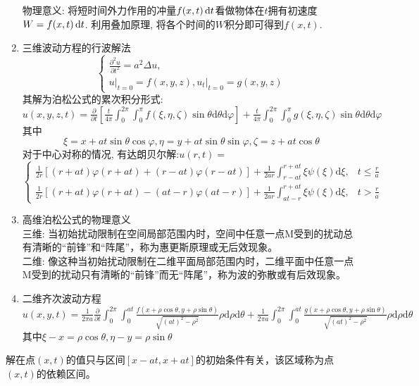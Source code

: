 \documentclass[UTF8,9pt]{ctexart}
\begin{document}
\begin{enumerate}
物理意义: 将短时间外力作用的冲量$f(x,t)\mathop{}\!\mathrm{d} t$看做物体在$t$拥有初速度$W = f(x,t)\mathop{}\!\mathrm{d} t$. 利用叠加原理, 将各个时间的$W$积分即可得到$f(x,t)$.
\item 三维波动方程的行波解法
$$\left\{\begin{array}{ll}{\frac{\partial^{2} u}{\partial t^{2}}=a^{2} \Delta u,}  \\ {\left.u\right|_{t=0}=f(x, y, z),\left.u_{t}\right|_{t=0}=g(x, y, z)}\end{array}\right.$$
其解为泊松公式的累次积分形式:\\
$ u(x,y,z,t)
=\frac{\partial}{\partial t}\left[\frac{t}{4 \pi} \int_{0}^{2 \pi} \int_{0}^{\pi} f(\xi, \eta, \zeta) \sin \theta \mathrm{d} \theta \mathrm{d} \varphi\right]+\frac{t}{4 \pi} \int_{0}^{2 \pi} \int_{0}^{\pi} g(\xi, \eta, \zeta) \sin \theta \mathrm{d} \theta \mathrm{d} \varphi
$
其中$$ 
\xi=x+a t \sin \theta \cos \varphi, \eta=y+a t \sin \theta \sin \varphi, \zeta=z+a t \cos \theta
$$
对于中心对称的情况, 有达朗贝尔解:$u(r, t)=$
$$ 
\left\{\begin{array}{ll}{\frac{1}{2 r}[(r+a t) \varphi(r+a t)+(r-a t) \varphi(r-a t)]+\frac{1}{2 a r} \int_{r-a t}^{r+a t} \xi \psi(\xi) \mathrm{d} \xi,} & {t \leq \frac{r}{a}} \\ {\frac{1}{2 r}[(r+a t) \varphi(r+a t)-(a t-r) \varphi(a t-r)]+\frac{1}{2 a r} \int_{a t-r}^{r+a t} \xi \psi(\xi) \mathrm{d} \xi,} & {t>\frac{r}{a}}\end{array}\right.
$$
\item 高维泊松公式的物理意义\\
三维: 当初始扰动限制在空间局部范围内时，空间中任意一点M受到的扰动总有清晰的“前锋”和“阵尾”，称为惠更斯原理或无后效现象。\\
二维: 像这种当初始扰动限制在二维平面局部范围内时，二维平面中任意一点M受到的扰动只有清晰的“前锋”而无“阵尾”，称为波的弥散或有后效现象。
\item 二维齐次波动方程\\
$
u(x, y, t)=\frac{1}{2 \pi a} \frac{\partial}{\partial t} \int_{0}^{2 \pi} \int_{0}^{at} \frac{f(x+\rho \cos \theta, y+\rho \sin \theta)}{\sqrt{(at)^{2}-\rho^{2}}} \rho \mathrm{d} \rho \mathrm{d} \theta+\frac{1}{2 \pi a} \int_{0}^{2 \pi} \int_{0}^{a t} \frac{g(x+\rho \cos \theta, y+\rho \sin \theta)}{\sqrt{(at)^{2}-\rho^{2}}} \rho \mathrm{d} \rho \mathrm{d} \theta
$\\
其中$\xi-x=\rho \cos \theta, \eta-y=\rho \sin \theta$
\end{enumerate}
解在点$(x,t)$的值只与区间$[x-at, x+at]$的初始条件有关，该区域称为点$(x,t)$的依赖区间。\\
\end{document}
